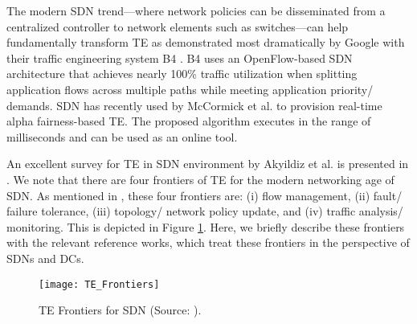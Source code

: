 \documentclass[10pt]{IEEEtran}
\begin{document}
The modern SDN trend---where network policies can be disseminated from a centralized controller to network elements such as switches---can help fundamentally transform TE as demonstrated most dramatically by Google with their traffic engineering system B4 \cite{jain2013b4}. B4 uses an OpenFlow-based SDN architecture that achieves nearly 100\% traffic utilization when splitting application flows across multiple paths while meeting application priority/ demands. SDN has recently used by McCormick et al. \cite{McCormick2014SDN} to provision real-time alpha fairness-based TE. The proposed algorithm executes in the range of milliseconds and can be used as an online tool.

An excellent survey for TE in SDN environment by Akyildiz et al. is presented in \cite{akyildiz2014roadmap}. We note that there are four frontiers of TE for the modern networking age of SDN. As mentioned in \cite{akyildiz2014roadmap}, these four frontiers are: (i) flow management, (ii) fault/ failure tolerance, (iii) topology/ network policy update, and (iv) traffic analysis/ monitoring. This is depicted in Figure \ref{fig:te_fron}. Here, we briefly describe these frontiers with the relevant reference works, which treat these frontiers in the perspective of SDNs and DCs.

\begin{figure}[!ht]
\centerline{\texttt{[image: TE\_Frontiers]}}
\caption{TE Frontiers for SDN (Source: \cite{akyildiz2014roadmap}).}
\label{fig:te_fron}
\end{figure}
\end{document}
